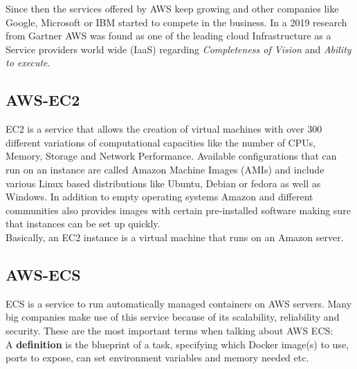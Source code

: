 Since then the services offered by AWS keep growing and other companies like Google, Microsoft or IBM started to compete in the business. In a 2019 research from Gartner AWS was found as one of the leading cloud Infrastructure as a Service providers world wide (IaaS) \cite{Gartner} 
regarding \emph{Completeness of Vision} and \emph{Ability to execute}. 

\subsection{AWS-EC2}
EC2 is a service that allows the creation of virtual machines with over 300 different variations of computational capacities like the number of CPUs, Memory, Storage and Network Performance. \cite{AwsEc2} 
Available configurations that can run on an instance are called Amazon Machine Images (AMIs) and include various Linux based distributions like Ubuntu, Debian or fedora as well as Windows. In addition to empty operating systems Amazon and different communities also provides images with certain pre-installed software making sure that instances can be set up quickly. \\
Basically, an EC2 instance is a virtual machine that runs on an Amazon server. \cite{Ec2VirtualMachine}


\subsection{AWS-ECS}
ECS is a service to run automatically managed containers on AWS servers. Many big companies make use of this service because of its scalability, reliability and security. \cite{AwsEc2}
These are the most important terms when talking about AWS ECS: \\

A \textbf{definition} is the blueprint of a task, specifying which Docker image(s) to use, ports to expose, can set environment variables and memory needed etc. \cite{CodeCampEcs}

